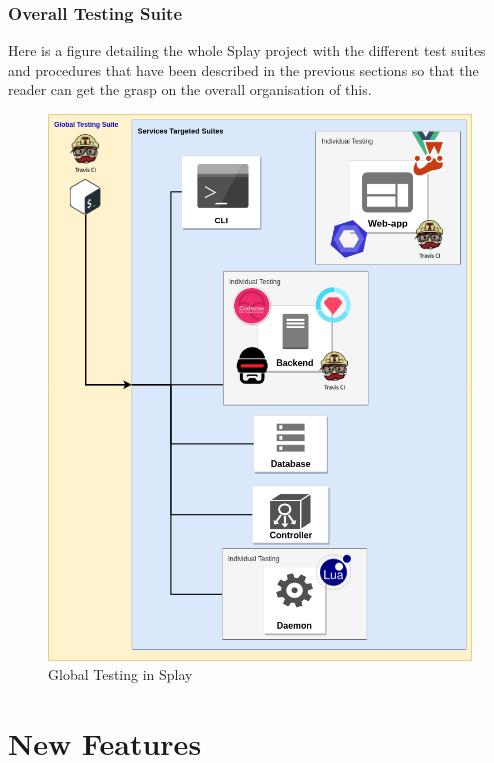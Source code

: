 \documentclass{eplmastersthesis}
\begin{document}
      \subsection{Overall Testing Suite}

        Here is a figure detailing the whole Splay project with the different
        test suites and procedures that have been described in the previous
        sections so that the reader can get the grasp on the overall
        organisation of this.

        \begin{figure}[H]
          \centering
          \includegraphics[scale=0.55]{figures/global_testing.png}
          \caption{\label{global_testing} Global Testing in Splay}
        \end{figure}

  \chapter{New Features}
\end{document}
